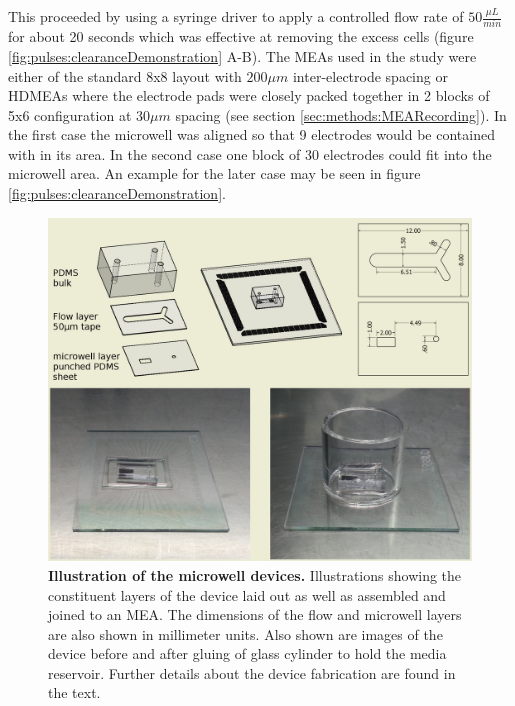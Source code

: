 This proceeded by using a syringe driver to apply a controlled flow rate of \(50\frac{\mu L}{min}\) for about 20 seconds which was effective at removing the excess cells (figure \ref{fig:pulses:clearanceDemonstration} A-B). The MEAs used in the study were either of the standard 8x8 layout with \(200 \mu m\) inter-electrode spacing or HDMEAs where the electrode pads were closely packed together in 2 blocks of 5x6 configuration at \(30 \mu m\) spacing (see section \ref{sec:methods:MEARecording}). In the first case the microwell was aligned so that 9 electrodes would be contained with in its area. In the second case one block of 30 electrodes could fit into the microwell area. An example for the later case may be seen in figure \ref{fig:pulses:clearanceDemonstration}. 

  \begin{figure}[h]
       \centering
       \includegraphics[width=15cm]{chapter6/figures/circularIllustration/circularIllustration.jpg}
       \caption[Illustration of the new microwell devices used for dopamine pulsing on a microculture]{\textbf{Illustration of the microwell devices.} Illustrations showing the constituent layers of the device laid out as well as assembled and joined to an MEA. The dimensions of the flow and microwell layers are also shown in millimeter units. Also shown are images of the device before and after gluing of glass cylinder to hold the media reservoir. Further details about the device fabrication are found in the text.}
       \label{fig:pulses:circularIllustration}

  \end{figure}

